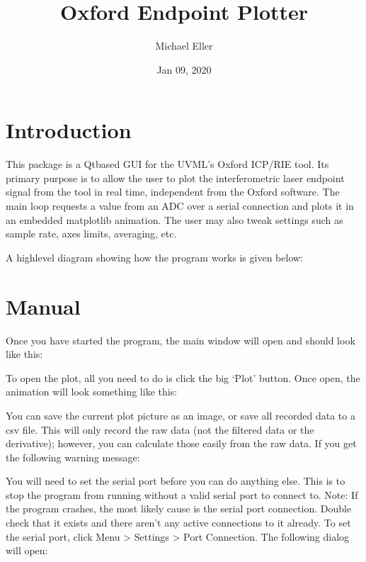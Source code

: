 \documentclass[letterpaper,10pt,english]{sphinxmanual}
\title{Oxford Endpoint Plotter}
\date{Jan 09, 2020}
\author{Michael Eller}
\begin{document}
\pagestyle{empty}
\sphinxmaketitle
\pagestyle{plain}
\sphinxtableofcontents
\pagestyle{normal}
\label{\detokenize{index::doc}}



\chapter{Introduction}
\label{\detokenize{introduction:introduction}}\label{\detokenize{introduction::doc}}
This package is a Qt\sphinxhyphen{}based GUI for the UVML’s Oxford ICP/RIE tool. Its primary purpose is to allow the user to plot the interferometric laser endpoint signal from the tool in real time, independent from the Oxford software. The main loop requests a value from an ADC over a serial connection and plots it in an embedded matplotlib animation. The user may also tweak settings such as sample rate, axes limits, averaging, etc.

A high\sphinxhyphen{}level diagram showing how the program works is given below:

\noindent{}


\chapter{Manual}
\label{\detokenize{manual:manual}}\label{\detokenize{manual::doc}}
Once you have started the program, the main window will open and should look like this:

\noindent{}

To open the plot, all you need to do is click the big ‘Plot’ button. Once open, the animation will look something like this:

\noindent{}

You can save the current plot picture as an image, or save all recorded data to a csv file. This will only record the raw data (not the filtered data or the derivative); however, you can calculate those easily from the raw data. If you get the following warning message:

\noindent{}

You will need to set the serial port before you can do anything else. This is to stop the program from running without a valid serial port to connect to. Note: If the program crashes, the most likely cause is the serial port connection. Double check that it exists and there aren’t any active connections to it already. To set the serial port, click Menu \textgreater{} Settings \textgreater{} Port Connection. The following dialog will open:
\end{document}
